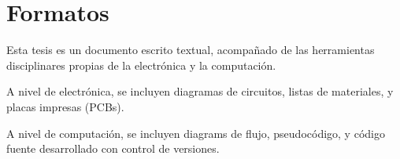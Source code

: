\documentclass[../proyecto.tex]{subfiles}
\begin{document}
\chapter{Formatos}



Esta tesis es un documento escrito textual, acompañado de las herramientas disciplinares propias de la electrónica y la computación.

A nivel de electrónica, se incluyen diagramas de circuitos, listas de materiales, y placas impresas (PCBs).

A nivel de computación, se incluyen diagrams de flujo, pseudocódigo, y código fuente desarrollado con control de versiones.
\end{document}

